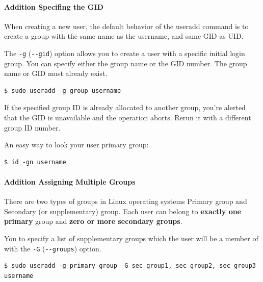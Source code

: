 \documentclass{article}
\newenvironment{blocktemplateI}[1]{%
    \tcolorbox[beamer,%
    noparskip,breakable,
    colframe=Violet,%
    colbacklower=Black,%
    title=#1]}%
    {\endtcolorbox}
\newenvironment{blocktemplateIII}[1]{%
    \tcolorbox[beamer,%
    noparskip,breakable,
    ,colframe=Red,%
    colbacklower=LimeGreen!75!LightGreen,%
    title=#1]}%
    {\endtcolorbox}
\newenvironment{codetemplate}[1][]{%
  \mybasecolorbox[#1]
  \itshape
}{%
  \endmybasecolorbox
}
\begin{document}
\paragraph{Addition Specifing the GID}
When creating a new user, the default behavior of the useradd command is to create a group with the same name as the username, and same GID as UID.

The \verb|-g| (\verb|--gid|) option allows you to create a user with a specific initial login group. You can specify either the group name or the GID number. The group name or GID must already exist.
\begin{codetemplate}{}
\begin{verbatim}
$ sudo useradd -g group username
\end{verbatim}
\end{codetemplate}

\begin{blocktemplateIII}{WARNING}
If the specified group ID is already allocated to another group, you're alerted that the GID is unavailable and the operation aborts. Rerun it with a different group ID number.
\end{blocktemplateIII}

\begin{blocktemplateI}{NOTE}
An easy way to look your user primary group:
\begin{codetemplate}{}
\begin{verbatim}
$ id -gn username
\end{verbatim}
\end{codetemplate}
\end{blocktemplateI}

\paragraph{Addition Assigning Multiple Groups}

There are two types of groups in Linux operating systems Primary group and Secondary (or supplementary) group. Each user can belong to \textbf{exactly one primary} group and\textbf{ zero or more secondary groups}.

You to specify a list of supplementary groups which the user will be a member of with the \verb|-G| (\verb|--groups|) option.
\begin{codetemplate}{}
\begin{verbatim}
$ sudo useradd -g primary_group -G sec_group1, sec_group2, sec_group3 username
\end{verbatim}
\end{codetemplate}
\end{document}
